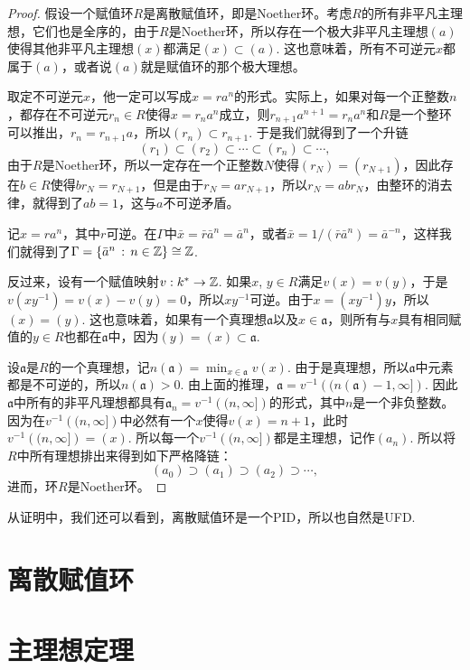 \begin{proof}
	假设一个赋值环$R$是离散赋值环，即是Noether环。考虑$R$的所有非平凡主理想，它们也是全序的，由于$R$是Noether环，所以存在一个极大非平凡主理想$(a)$使得其他非平凡主理想$(x)$都满足$(x)\subset (a)$. 这也意味着，所有不可逆元$x$都属于$(a)$，或者说$(a)$就是赋值环的那个极大理想。

	取定不可逆元$x$，他一定可以写成$x=ra^n$的形式。实际上，如果对每一个正整数$n$，都存在不可逆元$r_n\in R$使得$x=r_na^n$成立，则$r_{n+1}a^{n+1}=r_n a^n$和$R$是一个整环可以推出，$r_n = r_{n+1}a$，所以$(r_n)\subset r_{n+1}$. 于是我们就得到了一个升链
	\[
	(r_1)\subset (r_2)\subset \cdots \subset (r_n)\subset \cdots,
	\]
	由于$R$是Noether环，所以一定存在一个正整数$N$使得$(r_N)=(r_{N+1})$，因此存在$b\in R$使得$br_N=r_{N+1}$，但是由于$r_N=ar_{N+1}$，所以$r_N=abr_N$，由整环的消去律，就得到了$ab=1$，这与$a$不可逆矛盾。

	记$x=ra^n$，其中$r$可逆。在$\Gamma$中$\bar{x}=\bar{r}\bar{a}^n=\bar{a}^n$，或者$\bar{x}=1/(\bar{r}\bar{a}^n)=\bar{a}^{-n}$，这样我们就得到了$\Gamma=\{\bar{a}^n\,:\, n\in \mathbb{Z}\}\cong \mathbb{Z}$.

	反过来，设有一个赋值映射$v:k^*\to \mathbb{Z}$. 如果$x$, $y\in R$满足$v(x)=v(y)$，于是$v(xy^{-1})=v(x)-v(y)=0$，所以$xy^{-1}$可逆。由于$x=(xy^{-1})y$，所以$(x)=(y)$. 这也意味着，如果有一个真理想$\mathfrak{a}$以及$x\in \mathfrak{a}$，则所有与$x$具有相同赋值的$y\in R$也都在$\mathfrak{a}$中，因为$(y)=(x)\subset \mathfrak{a}$.

	设$\mathfrak{a}$是$R$的一个真理想，记$n(\mathfrak{a})=\min_{x\in \mathfrak{a}}v(x)$. 由于是真理想，所以$\mathfrak{a}$中元素都是不可逆的，所以$n(\mathfrak{a})>0$. 由上面的推理，$\mathfrak{a}=v^{-1}\left((n(\mathfrak{a})-1,\infty]\right)$. 因此$\mathfrak{a}$中所有的非平凡理想都具有$\mathfrak{a}_n=v^{-1}\left((n,\infty]\right)$的形式，其中$n$是一个非负整数。因为在$v^{-1}\left((n,\infty]\right)$中必然有一个$x$使得$v(x)=n+1$，此时$v^{-1}\left((n,\infty]\right)=(x)$. 所以每一个$v^{-1}\left((n,\infty]\right)$都是主理想，记作$(a_n)$. 所以将$R$中所有理想排出来得到如下严格降链：
	\[
		(a_0)\supset (a_1) \supset (a_2)\supset \cdots,
	\]
	进而，环$R$是Noether环。
\end{proof}

从证明中，我们还可以看到，离散赋值环是一个PID，所以也自然是UFD.

\section{离散赋值环}
\section{主理想定理}
